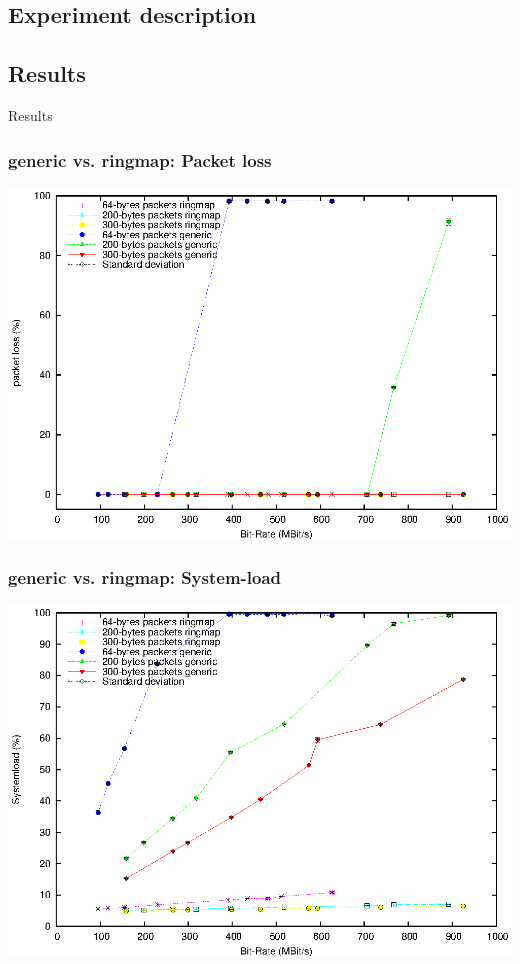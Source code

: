 \documentclass{beamer}
\begin{document}
\subsection*{Experiment description}

\subsection*{Results}
\begin{frame}
	\begin{center}
	\huge{Results}
	\end{center}
\end{frame}
\begin{frame}
\frametitle{generic vs. ringmap: Packet loss}
\begin{center}
\includegraphics [height=0.81\textheight]{plots/pktloss_generic_vs_ringmap_mbs.eps}
\end{center}
\end{frame}

\begin{frame}
\frametitle{generic vs. ringmap: System-load}
\begin{center}
\includegraphics [height=0.81\textheight]{plots/sysload_generic_vs_ringmap_mbs.eps}
\end{center}
\end{frame}
\end{document}
